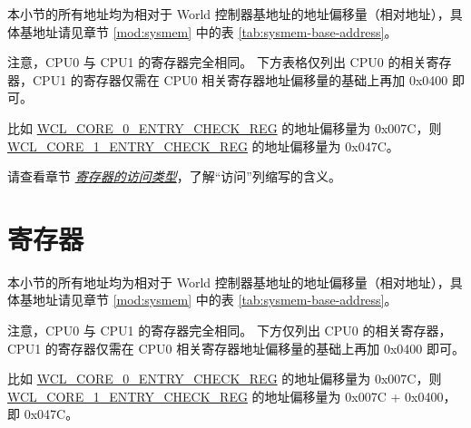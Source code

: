 \documentclass[main\_\_CN.tex]{subfiles}
\begin{document}
本小节的所有地址均为相对于 World 控制器基地址的地址偏移量（相对地址），具体基地址请见章节 \ref{mod:sysmem} \textit{} 中的表 \ref{tab:sysmem-base-address}。

注意，CPU0 与 CPU1 的寄存器完全相同。
下方表格仅列出 CPU0 的相关寄存器，CPU1 的寄存器仅需在 CPU0 相关寄存器地址偏移量的基础上再加 0x{}0400 即可。

比如 \hyperref[regdesc:WCLCORE0ENTRYCHECKREG]{WCL\_CORE\_0\_ENTRY\_CHECK\_REG} 的地址偏移量为 0x{}007C，则 \hyperref[regdesc:WCLCORE0ENTRYCHECKREG]{WCL\_CORE\_1\_ENTRY\_CHECK\_REG} 的地址偏移量为 0x{}047C。

请查看章节 \hyperref[glossary-access-types]{\textit{寄存器的访问类型}}，了解“访问”列缩写的含义。




\clearpage
\section{寄存器}

本小节的所有地址均为相对于 World 控制器基地址的地址偏移量（相对地址），具体基地址请见章节 \ref{mod:sysmem} \textit{} 中的表 \ref{tab:sysmem-base-address}。

注意，CPU0 与 CPU1 的寄存器完全相同。
下方仅列出 CPU0 的相关寄存器，CPU1 的寄存器仅需在 CPU0 相关寄存器地址偏移量的基础上再加 0x{}0400 即可。

比如 \hyperref[regdesc:WCLCORE0ENTRYCHECKREG]{WCL\_CORE\_0\_ENTRY\_CHECK\_REG} 的地址偏移量为 0x{}007C，则 \hyperref[regdesc:WCLCORE0ENTRYCHECKREG]{WCL\_CORE\_1\_ENTRY\_CHECK\_REG} 的地址偏移量为 0x{}007C + 0x{}0400，即 0x{}047C。


\end{document}
